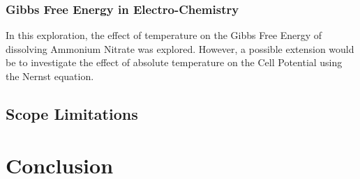 \documentclass{article}
\begin{document}
\subsubsection{Gibbs Free Energy in Electro-Chemistry}
In this exploration, the effect of temperature on the Gibbs Free Energy of dissolving Ammonium Nitrate was explored. However, a possible extension would be to investigate the effect of absolute temperature on the Cell Potential using the Nernst equation.

\subsection{Scope Limitations}


\section{Conclusion}
\end{document}
